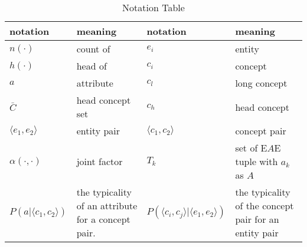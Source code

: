\renewcommand{\arraystretch}{-2}

\begin{table}[htbp]
  \centering
     \small
  \caption{Notation Table}
    \footnotesize

    \begin{tabular}{|ll|ll|}
    \hline
    notation                            &  meaning                            & notation                            &  meaning  \\
    \hline
    $n(\cdot)$                          &  count of                            & $e_i$                               &  entity  \\
    $h(\cdot)$                          &  head of                             & $c_i$                               &  concept  \\
    $a$                                 &  attribute                          & $c_l$                               &  long concept  \\
    $\bar{C}$                           &  head concept set                  & $c_h$                               &  head concept  \\
    $\langle e_1,e_2\rangle$            &  entity pair                        & $\langle c_1,c_2\rangle$            &  concept pair \\
    $\alpha(\cdot,\cdot)$               &  joint factor                       & $T_k$                               & \parbox{0.26\columnwidth}{ set of E$A$E tuple with $a_k$ as $A$} \\
    \parbox{0.15\columnwidth}{\scriptsize $P(a|\langle c_{1},c_{2}\rangle)$ }  &  \parbox{0.24\columnwidth}{ the typicality of an attribute for a concept pair. }& \parbox{0.23\columnwidth}{\scriptsize $P(\langle  c_{i},c_{j}\rangle|\langle e_{1},e_{2}\rangle)$} & \parbox{0.26\columnwidth}{ the typicality of the concept pair for an entity pair} \\
    \hline

    \end{tabular}%

  \label{tab:notation}%
\end{table}%


